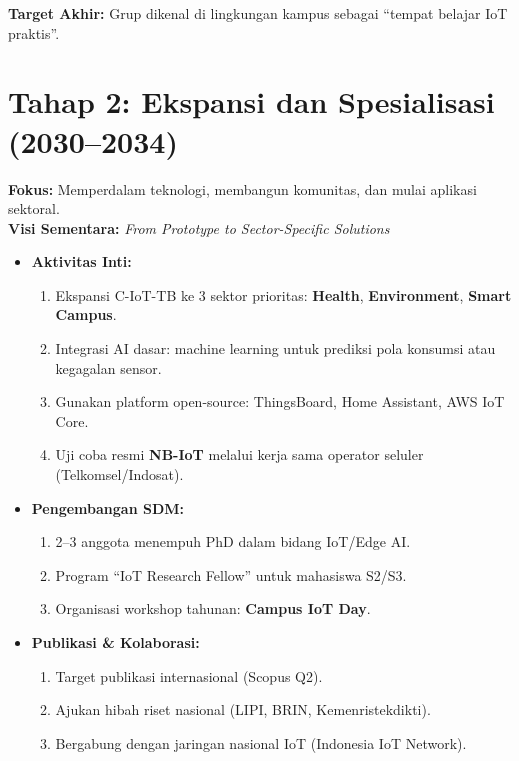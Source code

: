 \documentclass[11pt,a4paper]{article}
\begin{document}
\textbf{Target Akhir:} Grup dikenal di lingkungan kampus sebagai “tempat belajar IoT praktis”.

\section{Tahap 2: Ekspansi dan Spesialisasi (2030–2034)}
\label{sec:tahap2}

\textbf{Fokus:} Memperdalam teknologi, membangun komunitas, dan mulai aplikasi sektoral.\\
\textbf{Visi Sementara:} \textit{From Prototype to Sector-Specific Solutions}

\begin{itemize}
    \item \textbf{Aktivitas Inti:}
          \begin{enumerate}
              \item Ekspansi C-IoT-TB ke 3 sektor prioritas: \textbf{Health}, \textbf{Environment}, \textbf{Smart Campus}.
              \item Integrasi AI dasar: machine learning untuk prediksi pola konsumsi atau kegagalan sensor.
              \item Gunakan platform open-source: ThingsBoard, Home Assistant, AWS IoT Core.
              \item Uji coba resmi \textbf{NB-IoT} melalui kerja sama operator seluler (Telkomsel/Indosat).
          \end{enumerate}

    \item \textbf{Pengembangan SDM:}
          \begin{enumerate}
              \item 2–3 anggota menempuh PhD dalam bidang IoT/Edge AI.
              \item Program “IoT Research Fellow” untuk mahasiswa S2/S3.
              \item Organisasi workshop tahunan: \textbf{Campus IoT Day}.
          \end{enumerate}

    \item \textbf{Publikasi \& Kolaborasi:}
          \begin{enumerate}
              \item Target publikasi internasional (Scopus Q2).
              \item Ajukan hibah riset nasional (LIPI, BRIN, Kemenristekdikti).
              \item Bergabung dengan jaringan nasional IoT (Indonesia IoT Network).
          \end{enumerate}
\end{itemize}
\end{document}
